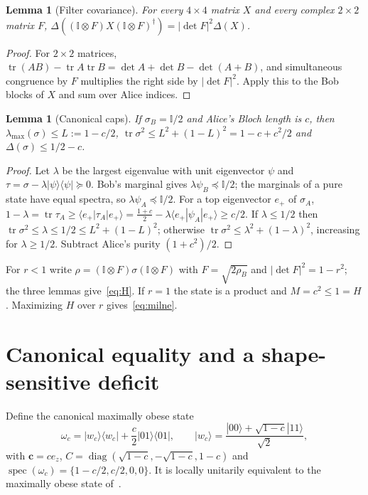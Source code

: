 \documentclass[11pt]{article}
\newtheorem{lemma}[theorem]{Lemma}
\theoremstyle{remark}\newtheorem{remark}[theorem]{Remark}
\DeclareMathOperator{\tr}{tr}\DeclareMathOperator{\diag}{diag}
\DeclareMathOperator{\spec}{spec}
\newcommand{\id}{\mathbb I}\newcommand{\ket}[1]{|#1\rangle}
\newcommand{\bra}[1]{\langle#1|}\newcommand{\proj}[1]{\ket{#1}\bra{#1}}
\newcommand{\cv}{\bm c}\newcommand{\av}{\bm a}\newcommand{\bv}{\bm b}
\begin{document}
\begin{lemma}[Filter covariance]\label{lem:covariance}
For every $4\times4$ matrix $X$ and every complex $2\times2$ matrix $F$,
$\Delta((\id\otimes F)X(\id\otimes F)^\dagger)=|\det F|^2\Delta(X)$.
\end{lemma}
\begin{proof}
For $2\times2$ matrices, $\tr(AB)-\tr A\tr B=\det A+\det B-\det(A+B)$, and
simultaneous congruence by $F$ multiplies the right side by $|\det F|^2$.
Apply this to the Bob blocks of $X$ and sum over Alice indices.
\end{proof}

\begin{lemma}[Canonical caps]\label{lem:cap}
If $\sigma_B=\id/2$ and Alice's Bloch length is $c$, then
$\lambda_{\max}(\sigma)\le L:=1-c/2$, $\tr\sigma^2\le L^2+(1-L)^2=1-c+c^2/2$
and $\Delta(\sigma)\le1/2-c$.
\end{lemma}
\begin{proof}
Let $\lambda$ be the largest eigenvalue with unit eigenvector $\psi$ and
$\tau=\sigma-\lambda\proj\psi\succeq0$. Bob's marginal gives
$\lambda\psi_B\preceq\id/2$; the marginals of a pure state have equal spectra,
so $\lambda\psi_A\preceq\id/2$. For a top eigenvector $e_+$ of $\sigma_A$,
$1-\lambda=\tr\tau_A\ge\bra{e_+}\tau_A\ket{e_+}=\tfrac{1+c}2-\lambda\bra{e_+}\psi_A\ket{e_+}\ge c/2$.
If $\lambda\le1/2$ then $\tr\sigma^2\le\lambda\le1/2\le L^2+(1-L)^2$; otherwise
$\tr\sigma^2\le\lambda^2+(1-\lambda)^2$, increasing for $\lambda\ge1/2$.
Subtract Alice's purity $(1+c^2)/2$.
\end{proof}

For $r<1$ write $\rho=(\id\otimes F)\sigma(\id\otimes F)$ with
$F=\sqrt{2\rho_B}$ and $|\det F|^2=1-r^2$; the three lemmas give~\eqref{eq:H}.
If $r=1$ the state is a product and $M=c^2\le1=H$. Maximizing $H$ over $r$
gives~\eqref{eq:milne}.

\section{Canonical equality and a shape-sensitive deficit}

Define the canonical maximally obese state
\begin{equation}\label{eq:obese}
 \omega_c=\proj{w_c}+\frac c2\proj{01},\qquad
 \ket{w_c}=\frac{\ket{00}+\sqrt{1-c}\ket{11}}{\sqrt2},
\end{equation}
with $\cv=ce_z$, $C=\diag(\sqrt{1-c},-\sqrt{1-c},1-c)$ and
$\spec(\omega_c)=\{1-c/2,c/2,0,0\}$. It is locally unitarily equivalent to
the maximally obese state of~\cite{milne}.
\end{document}
